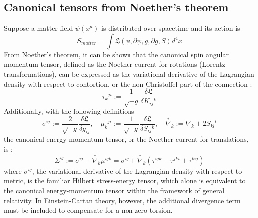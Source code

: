 \documentclass[12pt]{article}
\begin{document}
\subsection{Canonical tensors from Noether's theorem}
Suppose a matter field $\psi(x^a)$ is distributed over spacetime and its action is
\[ S_{matter} = \int \mathfrak{L}(\psi,\partial\psi, g,\partial g, S) d^4x \]
From Noether's theorem, it can be shown that the canonical spin angular momentum tensor, defined as the Noether current for rotations (Lorentz transformations), can be expressed as the variational derivative of the Lagrangian density with respect to contortion, or the non-Christoffel part of the connection \cite{hehl1976general}:
\[\tau_k{}^{ji} := \frac{1}{\sqrt{-g}}\frac{\delta\mathfrak{L}}{\delta K_{ij}{}^k}\]
Additionally, with the following definitions
\[ \sigma^{ij} := \frac{2}{\sqrt{-g}}\frac{\delta\mathfrak{L}}{\delta g_{ij}},
\quad \mu_{k}{}^{ji} := \frac{1}{\sqrt{-g}}\frac{\delta\mathfrak{L}}{\delta S_{ij}{}^k},
\quad \stackrel{*}{\nabla}_k := \nabla_k + 2S_{kl}{}^l\]
the canonical energy-momentum tensor, or the Noether current for translations, is \cite{hehl1976general}:
 \[ \Sigma^{ij} := \sigma^{ij} - \stackrel{*}{\nabla}_k\mu^{ijk}  = \sigma^{ij} + \stackrel{*}{\nabla}_k(\tau^{ijk} - \tau^{jki} + \tau^{kij})\]
where $\sigma^{ij}$, the variational derivative of the Lagrangian density with respect to metric, is the familiar Hilbert stress-energy tensor, which alone is equivalent to the canonical energy-momentum tensor within the framework of general relativity. In Einstein-Cartan theory, however, the additional divergence term must be included to compensate for a non-zero torsion.
\end{document}
